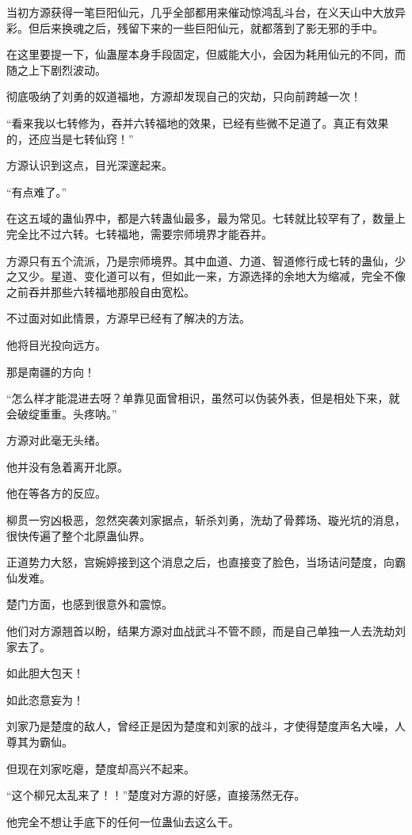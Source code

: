 \begin{this_body}
当初方源获得一笔巨阳仙元，几乎全部都用来催动惊鸿乱斗台，在义天山中大放异彩。但后来换魂之后，残留下来的一些巨阳仙元，就都落到了影无邪的手中。

在这里要提一下，仙蛊屋本身手段固定，但威能大小，会因为耗用仙元的不同，而随之上下剧烈波动。

彻底吸纳了刘勇的奴道福地，方源却发现自己的灾劫，只向前跨越一次！

“看来我以七转修为，吞并六转福地的效果，已经有些微不足道了。真正有效果的，还应当是七转仙窍！”

方源认识到这点，目光深邃起来。

“有点难了。”

在这五域的蛊仙界中，都是六转蛊仙最多，最为常见。七转就比较罕有了，数量上完全比不过六转。七转福地，需要宗师境界才能吞并。

方源只有五个流派，乃是宗师境界。其中血道、力道、智道修行成七转的蛊仙，少之又少。星道、变化道可以有，但如此一来，方源选择的余地大为缩减，完全不像之前吞并那些六转福地那般自由宽松。

不过面对如此情景，方源早已经有了解决的方法。

他将目光投向远方。

那是南疆的方向！

“怎么样才能混进去呀？单靠见面曾相识，虽然可以伪装外表，但是相处下来，就会破绽重重。头疼呐。”

方源对此毫无头绪。

他并没有急着离开北原。

他在等各方的反应。

柳贯一穷凶极恶，忽然突袭刘家据点，斩杀刘勇，洗劫了骨葬场、璇光坑的消息，很快传遍了整个北原蛊仙界。

正道势力大怒，宫婉婷接到这个消息之后，也直接变了脸色，当场诘问楚度，向霸仙发难。

楚门方面，也感到很意外和震惊。

他们对方源翘首以盼，结果方源对血战武斗不管不顾，而是自己单独一人去洗劫刘家去了。

如此胆大包天！

如此恣意妄为！

刘家乃是楚度的敌人，曾经正是因为楚度和刘家的战斗，才使得楚度声名大噪，人尊其为霸仙。

但现在刘家吃瘪，楚度却高兴不起来。

“这个柳兄太乱来了！！”楚度对方源的好感，直接荡然无存。

他完全不想让手底下的任何一位蛊仙去这么干。


\end{this_body}
